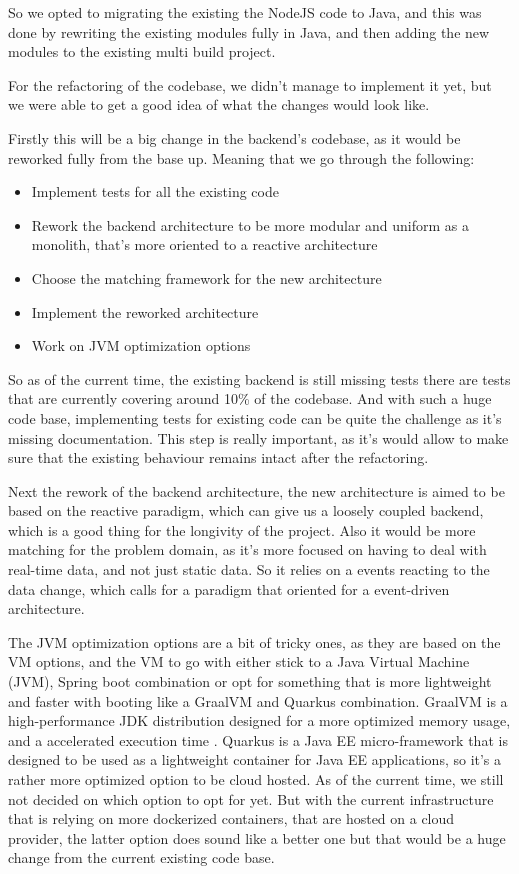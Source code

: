 So we opted to migrating the existing the NodeJS code to Java, and this was done by
rewriting the existing modules fully in Java, and then adding the new modules to the
existing multi build project.

For the refactoring of the codebase, we didn't manage to implement it yet, but we
were able to get a good idea of what the changes would look like.

Firstly this will be a big change in the backend's codebase, as it would be reworked
fully from the base up. Meaning that we go through the following:
    \begin{itemize}
        \item Implement tests for all the existing code
        \item Rework the backend architecture to be more modular and uniform
            as a monolith, that's more oriented to a reactive architecture
        \item Choose the matching framework for the new architecture
        \item Implement the reworked architecture
        \item Work on JVM optimization options
    \end{itemize}

So as of the current time, the existing backend is still missing tests 
there are tests that are currently covering around 10\% of the codebase.
And with such a huge code base, implementing tests for existing code can
be quite the challenge as it's missing documentation.
This step is really important, as it's would allow to make sure that the
existing behaviour remains intact after the refactoring.

Next the rework of the backend architecture, the new architecture is aimed to
be based on the reactive paradigm, which can give us a loosely coupled
backend, which is a good thing for the longivity of the project.
Also it would be more matching for the problem domain, as it's more focused
on having to deal with real-time data, and not just static data.
So it relies on a events reacting to the data change, which calls for a 
paradigm that oriented for a event-driven architecture.

The JVM optimization options are a bit of tricky ones, as they are
based on the VM options, and the VM to go with either stick to a Java Virtual Machine
(JVM), Spring boot combination or opt for something that is more lightweight and faster
with booting like a GraalVM and Quarkus combination.
GraalVM is a high-performance JDK distribution designed for a more optimized memory usage,
and a accelerated execution time \cite{grl_jvm}.
Quarkus is a Java EE micro-framework that is designed to be used as a lightweight
container for Java EE applications, so it's a rather more optimized option to be cloud
hosted.
As of the current time, we still not decided on which option to opt for yet.
But with the current infrastructure that is relying on more dockerized containers,
that are hosted on a cloud provider, the latter option does sound like a better one
but that would be a huge change from the current existing code base.
